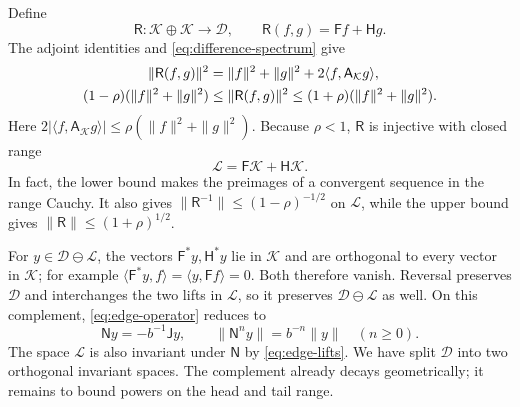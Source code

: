Define
\[
 \mathsf R:\mathcal K\oplus\mathcal K\longrightarrow\mathcal D,
 \qquad \mathsf R(f,g)=\mathsf Ff+\mathsf Hg.
\]
The adjoint identities and \eqref{eq:difference-spectrum} give
\begin{align}
 \|\mathsf R(f,g)\|^2
   &=\|f\|^2+\|g\|^2+2\langle f,\mathsf A_{\mathcal K}g\rangle,
   \notag\\
 (1-\rho)(\|f\|^2+\|g\|^2)
   &\le\|\mathsf R(f,g)\|^2
   \le(1+\rho)(\|f\|^2+\|g\|^2).
 \label{eq:lift-gram}
\end{align}
Here \(2|\langle f,\mathsf A_{\mathcal K}g\rangle|
\le\rho(\|f\|^2+\|g\|^2)\).
Because \(\rho<1\), \(\mathsf R\) is injective with closed range
\[
 \mathcal L=\mathsf F\mathcal K+\mathsf H\mathcal K.
\]
In fact, the lower bound makes the preimages of a convergent sequence
in the range Cauchy.  It also gives
\(\|\mathsf R^{-1}\|\le(1-\rho)^{-1/2}\) on \(\mathcal L\),
while the upper bound gives \(\|\mathsf R\|\le(1+\rho)^{1/2}\).

For \(y\in\mathcal D\ominus\mathcal L\), the vectors
\(\mathsf F^*y,\mathsf H^*y\) lie in \(\mathcal K\) and are
orthogonal to every vector in \(\mathcal K\); for example
\(\langle \mathsf F^*y,f\rangle=\langle y,\mathsf Ff\rangle=0\).
Both therefore vanish.  Reversal preserves \(\mathcal D\) and
interchanges the two lifts in \(\mathcal L\), so it preserves
\(\mathcal D\ominus\mathcal L\) as well.  On this complement,
\eqref{eq:edge-operator} reduces to
\begin{equation}
\label{eq:edge-complement}
 \mathsf Ny=-b^{-1}\mathsf Jy,\qquad
 \|\mathsf N^ny\|=b^{-n}\|y\|\quad(n\ge0).
\end{equation}
The space \(\mathcal L\) is also invariant under \(\mathsf N\)
by \eqref{eq:edge-lifts}.  We have split \(\mathcal D\) into
two orthogonal invariant spaces.  The complement already decays
geometrically; it remains to bound powers on the head and tail range.

